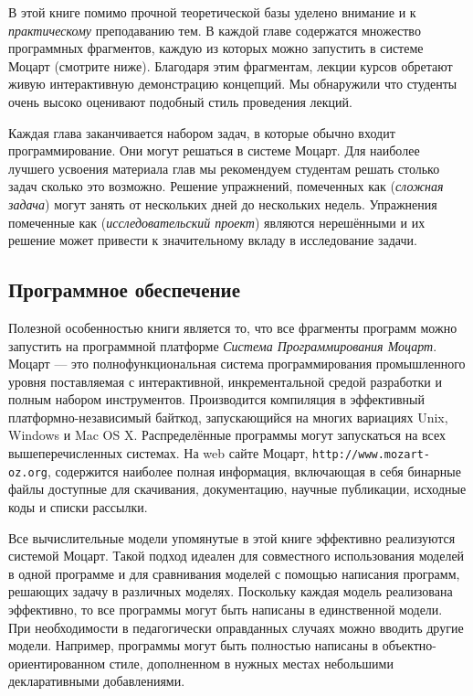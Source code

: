 В этой книге помимо прочной теоретической базы уделено внимание и к \emph{практическому} преподаванию тем. В каждой главе содержатся множество программных фрагментов, каждую из которых можно запустить в системе Моцарт (смотрите ниже). Благодаря этим фрагментам, лекции курсов обретают живую интерактивную демонстрацию концепций. Мы обнаружили что студенты очень высоко оценивают подобный стиль проведения лекций.

Каждая глава заканчивается набором задач, в которые обычно входит программирование. Они могут решаться в системе Моцарт. Для наиболее лучшего усвоения материала глав мы рекомендуем студентам решать столько задач сколько это возможно. Решение упражнений, помеченных как (\emph{сложная задача}) могут занять от нескольких дней до нескольких недель. Упражнения помеченные как (\emph{исследовательский проект}) являются нерешёнными и их решение может привести к значительному вкладу в исследование задачи.

\subsection*{Программное обеспечение}

Полезной особенностью книги является то, что все фрагменты программ можно запустить на программной платформе \emph{Система Программирования Моцарт}. Моцарт --- это полнофункциональная система программирования промышленного уровня поставляемая с интерактивной, инкрементальной средой разработки и полным набором инструментов. Производится компиляция в эффективный платформно-независимый байткод, запускающийся на многих вариациях Unix, Windows и Mac OS X. Распределённые программы могут запускаться на всех вышеперечисленных системах. На web сайте Моцарт, \verb|http://www.mozart-oz.org|, содержится наиболее полная информация, включающая в себя бинарные файлы доступные для скачивания, документацию, научные публикации, исходные коды и списки рассылки.

Все вычислительные модели упомянутые в этой книге эффективно реализуются системой Моцарт. Такой подход идеален для совместного использования моделей в одной программе и для сравнивания моделей с помощью написания программ, решающих задачу в различных моделях. Поскольку каждая модель реализована эффективно, то все программы могут быть написаны в единственной модели. При необходимости в педагогически оправданных случаях можно вводить другие модели. Например, программы могут быть полностью написаны в объектно-ориентированном стиле, дополненном в нужных местах небольшими декларативными добавлениями.

